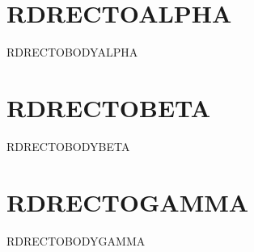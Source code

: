 \documentclass{abntexto-ufc}
\begin{document}
\textual

\section{RDRECTOALPHA}
RDRECTOBODYALPHA

\section{RDRECTOBETA}
RDRECTOBODYBETA

\section{RDRECTOGAMMA}
RDRECTOBODYGAMMA
\end{document}
